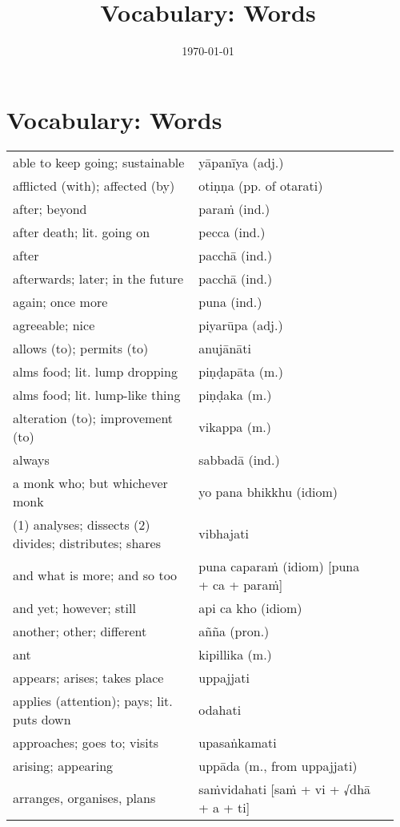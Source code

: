 \documentclass[a5paper]{memoir}
\date{\today}
\title{Vocabulary: Words}
\begin{document}
\chapter{Vocabulary: Words}
\label{sec:orge2529be}

\begin{longtable}{L{0.48\linewidth} L{0.48\linewidth} H}
able to keep going; sustainable & yāpanīya (adj.) & \\[0pt]
afflicted (with); affected (by) & otiṇṇa (pp. of otarati) & \\[0pt]
after; beyond & paraṁ (ind.) & \\[0pt]
after death; lit. going on & pecca (ind.) & \\[0pt]
after & pacchā (ind.) & \\[0pt]
afterwards; later; in the future & pacchā (ind.) & \\[0pt]
again; once more & puna (ind.) & \\[0pt]
agreeable; nice & piyarūpa (adj.) & \\[0pt]
allows (to); permits (to) & anujānāti & \\[0pt]
alms food; lit. lump dropping & piṇḍapāta (m.) & \\[0pt]
alms food; lit. lump-like thing & piṇḍaka (m.) & \\[0pt]
alteration (to); improvement (to) & vikappa (m.) & \\[0pt]
always & sabbadā (ind.) & \\[0pt]
a monk who; but whichever monk & yo pana bhikkhu (idiom) & \\[0pt]
(1) analyses; dissects (2) divides; distributes; shares & vibhajati & \\[0pt]
and what is more; and so too & puna caparaṁ (idiom) [puna + ca + paraṁ] & \\[0pt]
and yet; however; still & api ca kho (idiom) & \\[0pt]
another; other; different & añña (pron.) & \\[0pt]
ant & kipillika (m.) & \\[0pt]
appears; arises; takes place & uppajjati & \\[0pt]
applies (attention); pays; lit. puts down & odahati & \\[0pt]
approaches; goes to; visits & upasaṅkamati & \\[0pt]
arising; appearing & uppāda (m., from uppajjati) & \\[0pt]
arranges, organises, plans & saṁvidahati [saṁ + vi + √dhā + a + ti] & \\[0pt]

\end{longtable}
\end{document}

